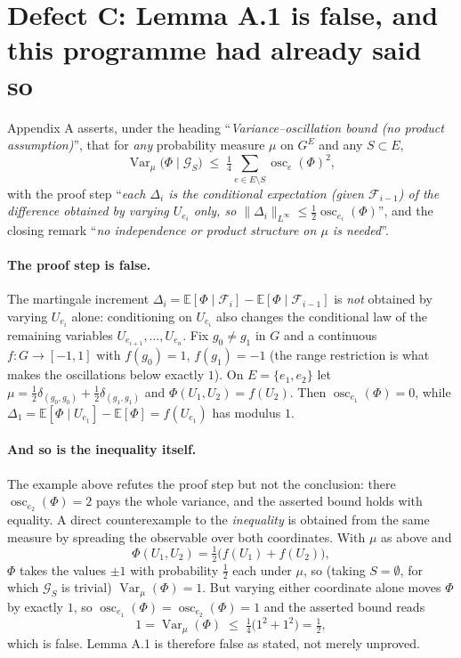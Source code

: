 \documentclass[11pt]{article}
\begin{document}
\section{Defect C: Lemma A.1 is false, and this programme had already said so}

Appendix A asserts, under the heading ``\emph{Variance--oscillation bound (no product
assumption)}'', that for \emph{any} probability measure $\mu$ on $G^E$ and any
$S\subset E$,
\[
\operatorname{Var}_\mu\!\bigl(\Phi\mid\mathcal G_S\bigr)\;\le\;
\tfrac14\sum_{e\in E\setminus S}\operatorname{osc}_e(\Phi)^2 ,
\]
with the proof step ``\emph{each $\Delta_i$ is the conditional expectation (given
$\mathcal F_{i-1}$) of the difference obtained by varying $U_{e_i}$ only, so
$\|\Delta_i\|_{L^\infty}\le\frac12\operatorname{osc}_{e_i}(\Phi)$}'', and the closing
remark ``\emph{no independence or product structure on $\mu$ is needed}''.

\paragraph{The proof step is false.}
The martingale increment
$\Delta_i=\mathbb E[\Phi\mid\mathcal F_i]-\mathbb E[\Phi\mid\mathcal F_{i-1}]$ is
\emph{not} obtained by varying $U_{e_i}$ alone: conditioning on $U_{e_i}$ also changes
the conditional law of the remaining variables $U_{e_{i+1}},\dots,U_{e_n}$. Fix
$g_0\neq g_1$ in $G$ and a continuous $f:G\to[-1,1]$ with $f(g_0)=1$,
$f(g_1)=-1$ (the range restriction is what makes the oscillations below exactly $1$).
On $E=\{e_1,e_2\}$ let
$\mu=\frac12\delta_{(g_0,g_0)}+\frac12\delta_{(g_1,g_1)}$ and
$\Phi(U_1,U_2)=f(U_2)$. Then $\operatorname{osc}_{e_1}(\Phi)=0$, while
$\Delta_1=\mathbb E[\Phi\mid U_{e_1}]-\mathbb E[\Phi]=f(U_{e_1})$ has modulus $1$.

\paragraph{And so is the inequality itself.}
The example above refutes the proof step but not the conclusion: there
$\operatorname{osc}_{e_2}(\Phi)=2$ pays the whole variance, and the asserted bound
holds with equality. A direct counterexample to the \emph{inequality} is obtained from
the same measure by spreading the observable over both coordinates. With $\mu$ as
above and
\[
\Phi(U_1,U_2)=\tfrac12\bigl(f(U_1)+f(U_2)\bigr),
\]
$\Phi$ takes the values $\pm1$ with probability $\tfrac12$ each under $\mu$, so
(taking $S=\emptyset$, for which $\mathcal G_S$ is trivial)
$\operatorname{Var}_\mu(\Phi)=1$. But varying either coordinate alone moves $\Phi$ by
exactly $1$, so $\operatorname{osc}_{e_1}(\Phi)=\operatorname{osc}_{e_2}(\Phi)=1$ and
the asserted bound reads
\[
1=\operatorname{Var}_\mu(\Phi)\;\le\;\tfrac14\bigl(1^2+1^2\bigr)=\tfrac12 ,
\]
which is false. Lemma A.1 is therefore false as stated, not merely unproved.
\end{document}
